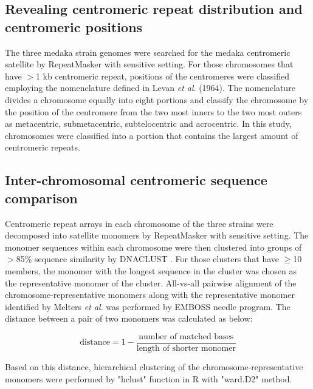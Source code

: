 \subsection*{Revealing centromeric repeat distribution and centromeric positions}
  The three medaka strain genomes were searched for the medaka centromeric satellite by RepeatMasker with sensitive setting. For those chromosomes that have $>$1 kb centromeric repeat, positions of the centromeres were classified employing the nomenclature defined in Levan \textit{et al}. (1964). The nomenclature divides a chromosome equally into eight portions and classify the chromosome by the position of the centromere from the two most inners to the two most outers as metacentric, submetacentric, subtelocentric and acrocentric. In this study, chromosomes were classified into a portion that contains the largest amount of centromeric repeats.


\subsection*{Inter-chromosomal centromeric sequence comparison}
  Centromeric repeat arrays in each chromosome of the three strains were decomposed into satellite monomers by RepeatMasker with sensitive setting. The monomer sequences within each chromosome were then clustered into groups of $>$85\% sequence similarity by DNACLUST \cite{}. For those clusters that have $\geq$10 members, the monomer with the longest sequence in the cluster was chosen as the representative monomer of the cluster. All-vs-all pairwise alignment of the chromosome-representative monomers along with the representative monomer identified by Melters \textit{et al}. was performed by EMBOSS needle program. The distance between a pair of two monomers was calculated as below:

  \[
    \mbox{distance} = 1 - \frac{\mbox{number of matched bases}}{\mbox{length of shorter monomer}}
  \]

  Based on this distance, hierarchical clustering of the chromosome-representative monomers were performed by "hclust" function in R with "ward.D2" method.

